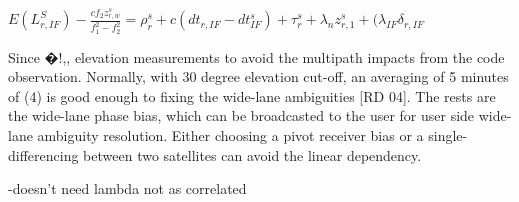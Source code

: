$
E(L_{r,IF}^S) - \frac{cf_2z_{r,w}^s}{f_1^2 - f_2^2} = \rho_r^s + c(dt_{r,IF} - dt_{IF}^s) + \tau_r^s + \lambda_n z_{r,1}^s + (\lambda_{IF}\delta_{r,IF}$

Since �!,,%
elevation measurements to avoid the multipath impacts from the code observation. Normally, with
30 degree elevation cut-off, an averaging of 5 minutes of (4) is good enough to fixing the wide-lane
ambiguities [RD 04]. The rests are the wide-lane phase bias, which can be broadcasted to the user for
user side wide-lane ambiguity resolution. Either choosing a pivot receiver bias or a single-differencing
between two satellites can avoid the linear dependency. 


-doesn't need lambda not as correlated
